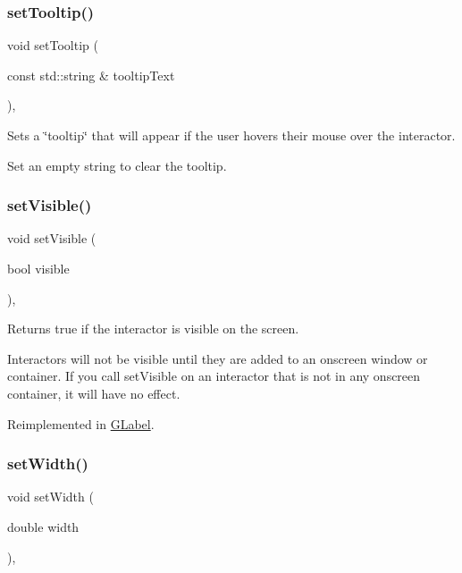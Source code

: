 \subsubsection{\texorpdfstring{set\+Tooltip()}{setTooltip()}}
{\footnotesize\ttfamily void set\+Tooltip (\begin{DoxyParamCaption}\item[{const std\+::string \&}]{tooltip\+Text }\end{DoxyParamCaption})\hspace{0.3cm}{\ttfamily [virtual]}, {\ttfamily [inherited]}}



Sets a \char`\"{}tooltip\char`\"{} that will appear if the user hovers their mouse over the interactor. 

Set an empty string to clear the tooltip. \mbox{\label{classsgl_1_1GInteractor_a18e44e30b31525a243960ca3928125aa}} 
\subsubsection{\texorpdfstring{set\+Visible()}{setVisible()}}
{\footnotesize\ttfamily void set\+Visible (\begin{DoxyParamCaption}\item[{bool}]{visible }\end{DoxyParamCaption})\hspace{0.3cm}{\ttfamily [virtual]}, {\ttfamily [inherited]}}



Returns true if the interactor is visible on the screen. 

Interactors will not be visible until they are added to an onscreen window or container. If you call set\+Visible on an interactor that is not in any onscreen container, it will have no effect. 

Reimplemented in \mbox{\hyperlink{classsgl_1_1GLabel_afcc2a51afef8e2e61d8d9191386fb93f}{G\+Label}}.

\mbox{\label{classsgl_1_1GInteractor_aa3f3fba4cb131baa8696ba01e3bceca1}} 
\subsubsection{\texorpdfstring{set\+Width()}{setWidth()}}
{\footnotesize\ttfamily void set\+Width (\begin{DoxyParamCaption}\item[{double}]{width }\end{DoxyParamCaption})\hspace{0.3cm}{\ttfamily [virtual]}, {\ttfamily [inherited]}}



